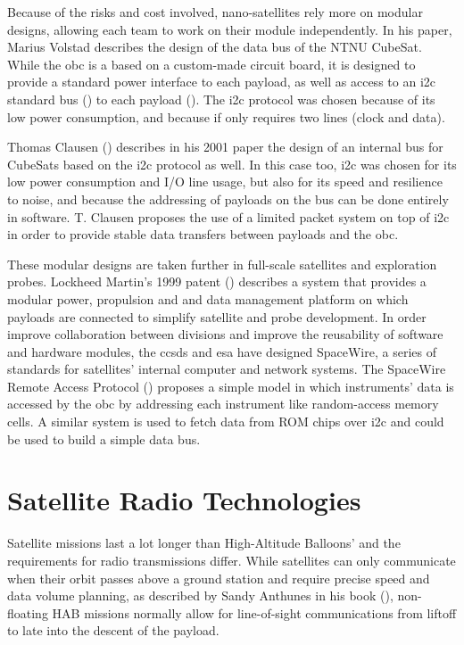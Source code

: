 Because of the risks and cost involved, nano-satellites rely more on modular designs, allowing each team to work on their module independently. In his paper, Marius Volstad describes the design of the data bus of the NTNU CubeSat. While the \acrlong{obc} is a based on a custom-made circuit board, it is designed to provide a standard power interface to each payload, as well as access to an \acrshort{i2c} standard bus (\cite{NXPSemiconductors2014}) to each payload (\cite{Volstad2011}). The \acrshort{i2c} protocol was chosen because of its low power consumption, and because if only requires two lines (clock and data).

Thomas Clausen (\cite{Clausen2001}) describes in his 2001 paper the design of an internal bus for CubeSats based on the \acrshort{i2c} protocol as well. In this case too, \acrshort{i2c} was chosen for its low power consumption and I/O line usage, but also for its speed and resilience to noise, and because the addressing of payloads on the bus can be done entirely in software. T. Clausen proposes the use of a limited packet system on top of \acrshort{i2c} in order to provide stable data transfers between payloads and the \acrlong{obc}.

These modular designs are taken further in full-scale satellites and exploration probes. Lockheed Martin's 1999 patent (\cite{Benedetti1999}) describes a system that provides a modular power, propulsion and and data management platform on which payloads are connected to simplify satellite and probe development. In order improve collaboration between divisions and improve the reusability of software and hardware modules, the \acrfull{ccsds} and \acrfull{esa} have designed SpaceWire, a series of standards for satellites' internal computer and network systems. The SpaceWire Remote Access Protocol (\cite{parkes2005}) proposes a simple model in which instruments' data is accessed by the \acrlong{obc} by addressing each instrument like random-access memory cells. A similar system is used to fetch data from ROM chips over \acrshort{i2c} and could be used to build a simple data bus.

\section{Satellite Radio Technologies}

Satellite missions last a lot longer than High-Altitude Balloons' and the requirements for radio transmissions differ. While satellites can only communicate when their orbit passes above a ground station and require precise speed and data volume planning, as described by Sandy Anthunes in his book (\cite{Antunes2015}), non-floating HAB missions normally allow for line-of-sight communications from liftoff to late into the descent of the payload.

